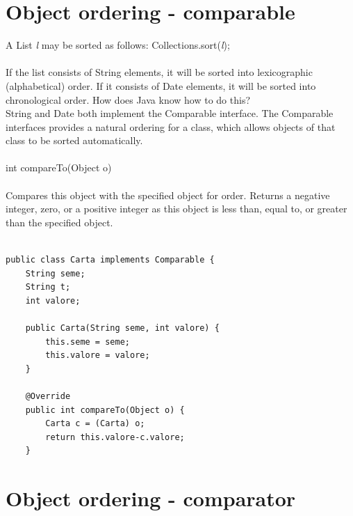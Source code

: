 \documentclass[10pt,a4paper]{book}
\begin{document}
\section{Object ordering - comparable}
A List \textit{l} may be sorted as follows:  Collections.sort(\textit{l}); \\\\
If the list consists of String elements, it will be sorted into lexicographic (alphabetical) order. If it consists of Date elements, it will be sorted into chronological order. How does Java know how to do this? \\
String and Date both implement the Comparable interface. The Comparable interfaces provides a natural ordering for a class, which allows objects of that class to be sorted automatically. \\\\
int compareTo(Object o) \\\\
Compares this object with the specified object for order. Returns a negative integer, zero, or a positive integer as this object is less than, equal to, or greater than the specified object. 
\\\\
\begin{verbatim}
public class Carta implements Comparable { 
    String seme;
    String t;
    int valore;
    
    public Carta(String seme, int valore) {
        this.seme = seme;
        this.valore = valore;
    }
    
    @Override
    public int compareTo(Object o) {
        Carta c = (Carta) o;
        return this.valore-c.valore;
    }

\end{verbatim}

\newpage
\section{Object ordering - comparator}
\end{document}
